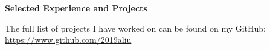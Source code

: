 \documentclass[letterpaper,10pt]{article}
\newcommand{\resheading}[1]{{\large \colorbox{mygrey}{\begin{minipage}{\textwidth}{\textbf{#1 \vphantom{p\^{E}}}}\end{minipage}}}}
\begin{document}


\resheading{Selected Experience and Projects}

\vspace{1em}
The full list of projects I have worked on can be found on my GitHub: \url{https://www.github.com/2019aliu}
\end{document}

